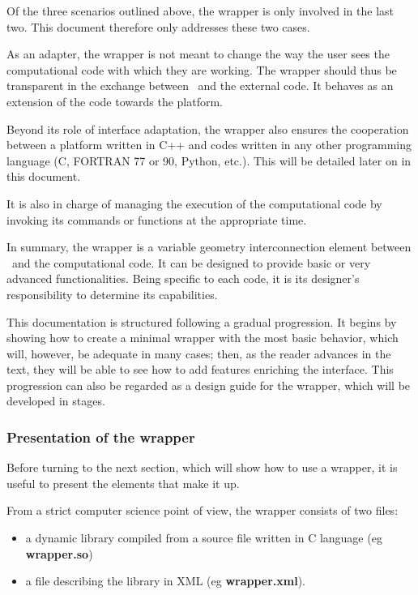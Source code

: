Of the three scenarios outlined above, the wrapper is only involved in the last two. This document therefore only addresses these two cases.

As an adapter, the wrapper is not meant to change the way the user sees the computational code with which they are working. The wrapper should thus be transparent in the exchange between \OT\ and the external code. It behaves as an extension of the code towards the platform.

Beyond its role of interface adaptation, the wrapper also ensures the cooperation between a platform written in C++ and codes written in any other programming language (C, FORTRAN 77 or 90, Python, etc.). This will be detailed later on in this document.

It is also in charge of managing the execution of the computational code by invoking its commands or functions at the appropriate time.

In summary, the wrapper is a variable geometry interconnection element between \OT\ and the computational code. It can be designed to provide basic or very advanced functionalities. Being specific to each code, it is its designer's responsibility to determine its capabilities.

This documentation is structured following a gradual progression. It begins by showing how to create a minimal wrapper with the most basic behavior, which will, however, be adequate in many cases; then, as the reader advances in the text, they will be able to see how to add features enriching the interface. This progression can also be regarded as a design guide for the wrapper, which will be developed in stages.

\subsubsection{Presentation of the wrapper}

Before turning to the next section, which will show how to use a wrapper, it is useful to present the elements that make it up.

From a strict computer science point of view, the wrapper consists of two files:
\begin{itemize}
\item a dynamic library compiled from a source file written in C language (eg {\bf {}wrapper.so})
\item a file describing the library in XML (eg {\bf {}wrapper.xml}).
\end{itemize}

